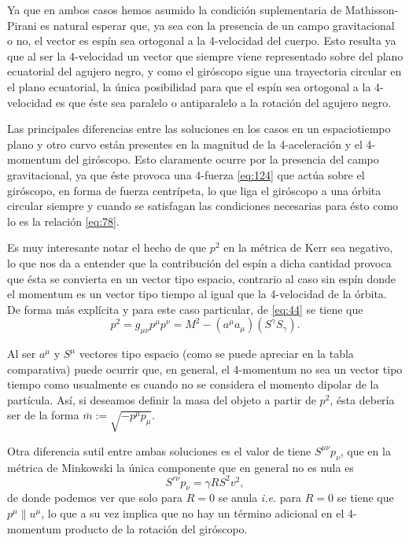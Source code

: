 Ya que en ambos casos hemos asumido la condición suplementaria de Mathisson-Pirani es natural esperar que, ya sea con la presencia de un campo gravitacional o no, el vector es espín sea ortogonal a la 4-velocidad del cuerpo. Esto resulta ya que al ser la 4-velocidad un vector que siempre viene representado sobre del plano ecuatorial del agujero negro, y como el giróscopo sigue una trayectoria circular en el plano ecuatorial, la única posibilidad para que el espín sea ortogonal a la 4-velocidad es que éste sea paralelo o antiparalelo a la rotación del agujero negro.

Las principales diferencias entre las soluciones en los casos en un espaciotiempo plano y otro curvo están presentes en la magnitud de la 4-aceleración y el 4-momentum del giróscopo. Esto claramente ocurre por la presencia del campo gravitacional, ya que éste provoca una 4-fuerza \eqref{eq:124} que actúa sobre el giróscopo, en forma de fuerza centrípeta, lo que liga el giróscopo a una órbita circular siempre y cuando se satisfagan las condiciones necesarias para ésto como lo es la relación \eqref{eq:78}.

Es muy interesante notar el hecho de que $p^2$ en la métrica de Kerr sea negativo, lo que nos da a entender que la contribución del espín a dicha cantidad provoca que ésta se convierta en un vector tipo espacio, contrario al caso sin espín donde el momentum es un vector tipo tiempo al igual que la 4-velocidad de la órbita. De forma más explícita y para este caso particular, de \eqref{eq:44} se tiene que
\begin{equation}
p^2 = g_{\mu \nu} p^{\mu} p^{\nu} = M^2 - \left( a^{\mu}a_{\mu} \right) \left( S^{\gamma}S_{\gamma} \right).
\end{equation}

Al ser $a^{\mu}$ y $S^{\mu}$ vectores tipo espacio (como se puede apreciar en la tabla comparativa) puede ocurrir que, en general, el 4-momentum no sea un vector tipo tiempo como usualmente es cuando no se considera el momento dipolar de la partícula. Así, si deseamos definir la masa del objeto a partir de $p^2$, ésta debería ser de la forma $\bar{m}:= \sqrt{-p^{\mu} p_{\mu}}$.

Otra diferencia sutil entre ambas soluciones es el valor de tiene $S^{\mu \nu} p_{\nu}$, que en la métrica de Minkowski la única componente que en general no es nula es
\begin{equation}
S^{r \nu} p_{\nu} = \gamma R S^2 v^2,
\end{equation}
de donde podemos ver que solo para $R=0$ se anula \textit{i.e.} para $R=0$ se tiene que $p^{\mu} \parallel u^{\mu}$, lo que a su vez implica que no hay un término adicional en el 4-momentum producto de la rotación del giróscopo. 

